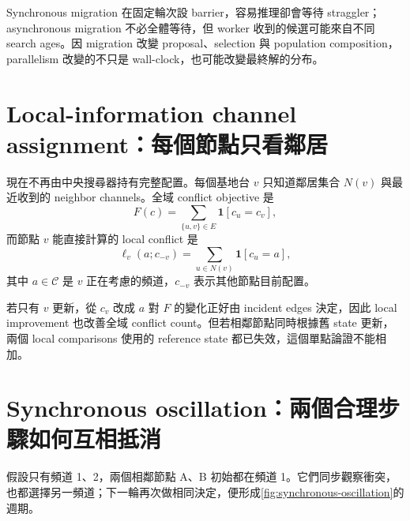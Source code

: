 \documentclass[11pt,a4paper,oneside,openany]{book}
\begin{document}
Synchronous migration 在固定輪次設 barrier，容易推理卻會等待 straggler；asynchronous migration 不必全體等待，但 worker 收到的候選可能來自不同 search ages。因 migration 改變 proposal、selection 與 population composition，parallelism 改變的不只是 wall-clock，也可能改變最終解的分布。

\section{Local-information channel assignment：每個節點只看鄰居}

現在不再由中央搜尋器持有完整配置。每個基地台 $v$ 只知道鄰居集合 $N(v)$ 與最近收到的 neighbor channels。全域 conflict objective 是
\[
 F(c)=\sum_{\{u,v\}\in E}\mathbf 1[c_u=c_v],
\]
而節點 $v$ 能直接計算的 local conflict 是
\[
 \ell_v(a;c_{-v})
 =\sum_{u\in N(v)}\mathbf 1[c_u=a],
\]
其中 $a\in\mathcal C$ 是 $v$ 正在考慮的頻道，$c_{-v}$ 表示其他節點目前配置。

若只有 $v$ 更新，從 $c_v$ 改成 $a$ 對 $F$ 的變化正好由 incident edges 決定，因此 local improvement 也改善全域 conflict count。但若相鄰節點同時根據舊 state 更新，兩個 local comparisons 使用的 reference state 都已失效，這個單點論證不能相加。

\section{Synchronous oscillation：兩個合理步驟如何互相抵消}

假設只有頻道 1、2，兩個相鄰節點 A、B 初始都在頻道 1。它們同步觀察衝突，也都選擇另一頻道；下一輪再次做相同決定，便形成\cref{fig:synchronous-oscillation}的週期。
\end{document}
